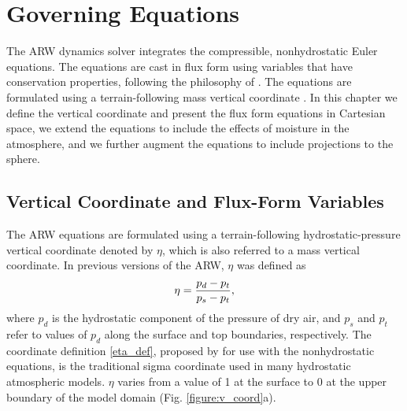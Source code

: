 \chapter{Governing Equations}
\label{equation_chap}

The ARW dynamics solver integrates the compressible, nonhydrostatic
Euler equations.  The equations are cast in flux form using variables
that have conservation properties, following the philosophy of \citet{ooyama90}.
The equations are formulated using a terrain-following mass
vertical coordinate \citep{laprise92}.  In this chapter we define
the vertical coordinate and present the flux form equations in Cartesian
space, we extend the equations to include the effects of moisture in the
atmosphere, and we further augment the equations to include
projections to the sphere.

\section{Vertical Coordinate and Flux-Form Variables}

%
%
The ARW equations are formulated using a terrain-following
hydrostatic-pressure vertical coordinate denoted by $\eta$, which is also referred to a mass 
vertical coordinate. In previous versions of the ARW, $\eta$ was defined as
%
\begin{equation}
\eta = {p_d-p_{t}\over p_{s}-p_{t}},
\label{eta_def}
\end{equation}
where $p_d$ is the hydrostatic component of the pressure of dry air, and
$p_{s}$ and $p_{t}$ refer to values of $p_d$ along the surface and top
boundaries, respectively. The coordinate definition \eqref{eta_def},
proposed by \citet{laprise92} for use with the nonhydrostatic equations, 
is the traditional sigma coordinate used
in many hydrostatic atmospheric models.  $\eta$ varies from a value of 1
at the surface to 0 at the upper boundary of the model domain (Fig. \ref{figure:v_coord}a).

